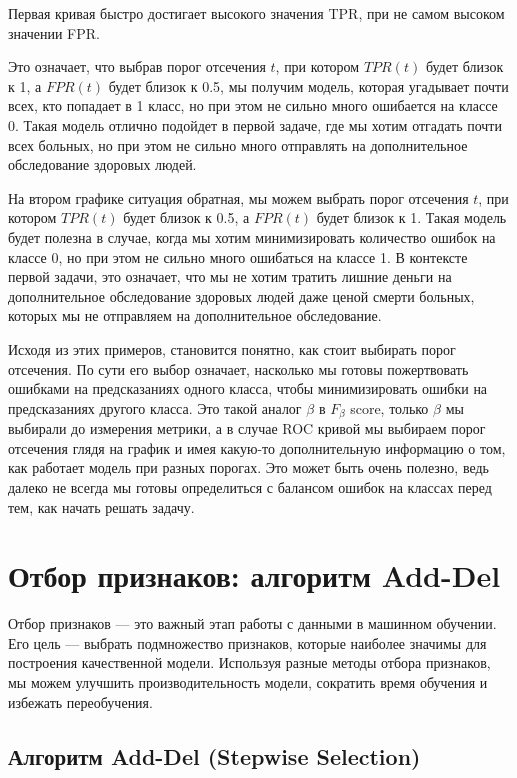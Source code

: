 Первая кривая быстро достигает высокого значения TPR, при не самом высоком значении FPR.

Это означает, что выбрав порог отсечения $t$, при котором $TPR(t)$ будет близок к 1, а $FPR(t)$ будет близок к 0.5, мы получим модель,
которая угадывает почти всех, кто попадает в 1 класс, но при этом не сильно много ошибается на классе 0.
Такая модель отлично подойдет в первой задаче, где мы хотим отгадать почти всех больных, но при этом не сильно много отправлять на дополнительное обследование здоровых людей.

На втором графике ситуация обратная, мы можем выбрать порог отсечения $t$, при котором $TPR(t)$ будет близок к 0.5, а $FPR(t)$ будет близок к 1.
Такая модель будет полезна в случае, когда мы хотим минимизировать количество ошибок на классе 0, но при этом не сильно много ошибаться на классе 1.
В контексте первой задачи, это означает, что мы не хотим тратить лишние деньги на дополнительное обследование здоровых людей даже ценой смерти больных, которых мы не отправляем на дополнительное обследование.

Исходя из этих примеров, становится понятно, как стоит выбирать порог отсечения. По сути его выбор означает, насколько мы готовы пожертвовать ошибками на предсказаниях одного класса, чтобы минимизировать ошибки на предсказаниях другого класса.
Это такой аналог $\beta$ в $F_{\beta}$ score, только $\beta$ мы выбирали до измерения метрики, а в случае ROC кривой мы выбираем порог отсечения глядя на график и имея какую-то дополнительную информацию о том, как работает модель при разных порогах.
Это может быть очень полезно, ведь далеко не всегда мы готовы определиться с балансом ошибок на классах перед тем, как начать решать задачу.


\section*{Отбор признаков: алгоритм Add-Del}

Отбор признаков — это важный этап работы с данными в машинном обучении. Его цель — выбрать подмножество признаков, которые наиболее значимы для построения качественной модели. Используя разные методы отбора признаков, мы можем улучшить производительность модели, сократить время обучения и избежать переобучения. 




\subsection*{Алгоритм Add-Del (Stepwise Selection)}

